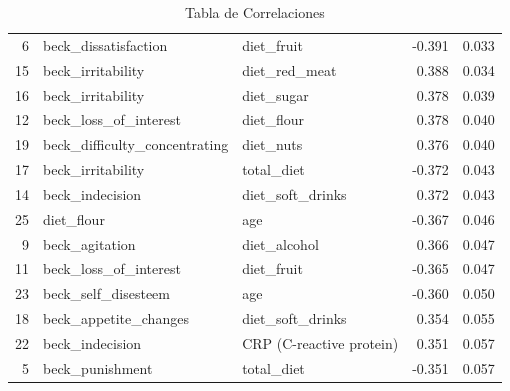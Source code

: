 \documentclass[man]{apa7}
\begin{document}
\begin{table}[]
{\begin{tabular}{@{}rllrr@{}}
				6                    & beck\_dissatisfaction        & diet\_fruit               & -0.391                          & 0.033                        \\
				15                   & beck\_irritability           & diet\_red\_meat           & 0.388                           & 0.034                        \\
				16                   & beck\_irritability           & diet\_sugar               & 0.378                           & 0.039                        \\
				12                   & beck\_loss\_of\_interest     & diet\_flour               & 0.378                           & 0.040                        \\
				19                   & beck\_difficulty\_concentrating & diet\_nuts             & 0.376                           & 0.040                        \\
				17                   & beck\_irritability           & total\_diet               & -0.372                          & 0.043                        \\
				14                   & beck\_indecision             & diet\_soft\_drinks        & 0.372                           & 0.043                        \\
				25                   & diet\_flour                  & age                       & -0.367                          & 0.046                        \\
				9                    & beck\_agitation              & diet\_alcohol             & 0.366                           & 0.047                        \\
				11                   & beck\_loss\_of\_interest     & diet\_fruit               & -0.365                          & 0.047                        \\
				23                   & beck\_self\_disesteem        & age                       & -0.360                          & 0.050                        \\
				18                   & beck\_appetite\_changes      & diet\_soft\_drinks        & 0.354                           & 0.055                        \\
				22                   & beck\_indecision             & CRP (C-reactive protein)  & 0.351                           & 0.057                        \\
				5                    & beck\_punishment             & total\_diet               & -0.351                          & 0.057                        \\ \bottomrule
			\end{tabular}%
		}
		\caption{Tabla de Correlaciones}
		\label{tab:tableOfCorr}
	\end{table}
\end{document}
